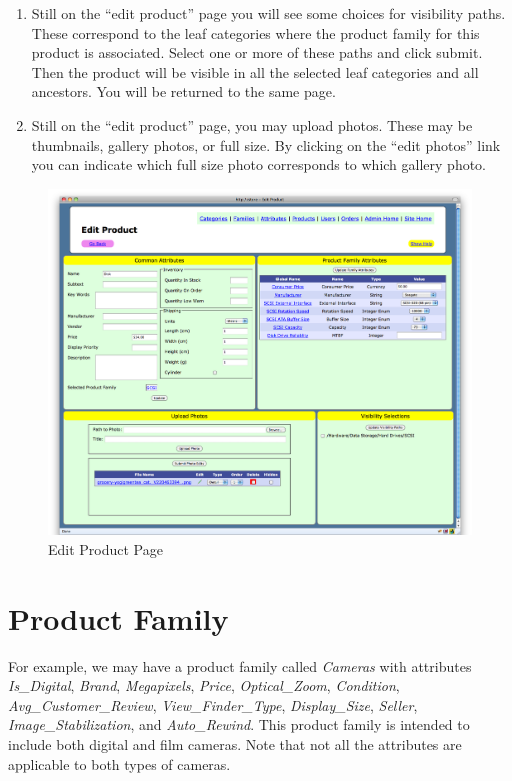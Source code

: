 \documentclass[letterpaper, 12pt]{article}
\begin{document}
\begin{enumerate}
\item Still on the ``edit product'' page you will see some choices for visibility paths.  These correspond to the leaf categories where the product family for this product is associated.  Select one or more of these paths and click submit.  Then the product will be visible in all the selected leaf categories and all ancestors.  You will be returned to the same page.
\item Still on the ``edit product'' page, you may upload photos.  These may be thumbnails, gallery photos, or full size.  By clicking on the ``edit photos'' link you can indicate which full size photo corresponds to which gallery photo.  
\end{enumerate}


\begin{center}
\begin{figure}
\includegraphics[scale=0.35]{product-edit}
\caption{\label{product-edit}Edit Product Page}
\end{figure}
\end{center}

\section{Product Family}
For example, we may have a product family called {\em Cameras} with attributes {\em Is\_Digital}, {\em Brand}, {\em Megapixels}, {\em Price}, {\em Optical\_Zoom}, {\em Condition}, {\em Avg\_Customer\_Review}, {\em View\_Finder\_Type}, {\em Display\_Size}, {\em Seller}, {\em Image\_Stabilization}, and {\em Auto\_Rewind}.  This product family is intended to include both digital and film cameras.  Note that not all the attributes are applicable to both types of cameras.
\end{document}
